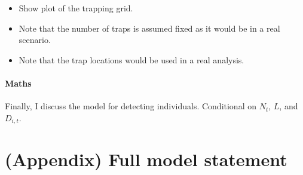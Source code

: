 \documentclass[
]{book}
\providecommand{\tightlist}{%
  \setlength{\itemsep}{0pt}\setlength{\parskip}{0pt}}
\begin{document}
\begin{itemize}
\tightlist
\item
  Show plot of the trapping grid.
\item
  Note that the number of traps is assumed fixed as it would be in a real scenario.
\item
  Note that the trap locations would be used in a real analysis.
\end{itemize}

\hypertarget{maths}{%
\subsubsection{Maths}\label{maths}}

Finally, I discuss the model for detecting individuals. Conditional on \(N_t\), \(L\), and \(D_{i, t}\).

\hypertarget{appendix-full-model-statement}{%
\chapter{(Appendix) Full model statement}\label{appendix-full-model-statement}}
\end{document}
